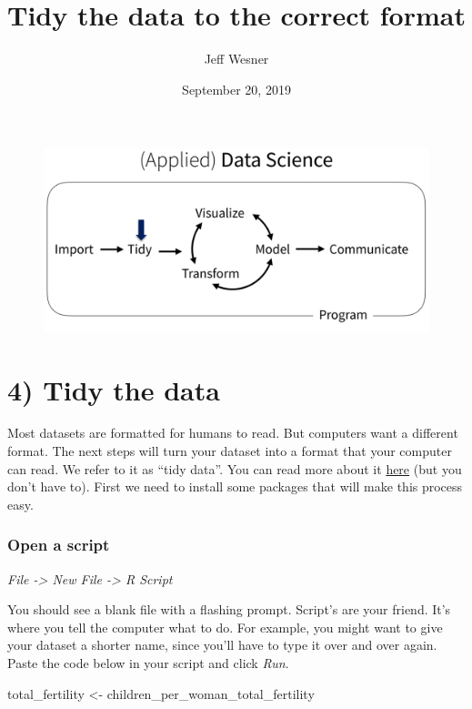 \documentclass[]{article}
\title{Tidy the data to the correct format}
\author{Jeff Wesner}
\date{September 20, 2019}
\newenvironment{Shaded}{\begin{snugshade}}{\end{snugshade}}
\newcommand{\StringTok}[1]{\textcolor[rgb]{0.31,0.60,0.02}{#1}}
\newcommand{\NormalTok}[1]{#1}
\begin{document}
\maketitle

\begin{figure}
\centering
\includegraphics{data_workflow_tidy.png}
\caption{}
\end{figure}

\section{4) Tidy the data}\label{tidy-the-data}

Most datasets are formatted for humans to read. But computers want a
different format. The next steps will turn your dataset into a format
that your computer can read. We refer to it as ``tidy data''. You can
read more about it
\href{http://www.cs.umd.edu/class/fall2018/cmsc641/files/tidy_data.pdf}{here}
(but you don't have to). First we need to install some packages that
will make this process easy.

\subsubsection{Open a script}\label{open-a-script}

\emph{File -\textgreater{} New File -\textgreater{} R Script}

You should see a blank file with a flashing prompt. Script's are your
friend. It's where you tell the computer what to do. For example, you
might want to give your dataset a shorter name, since you'll have to
type it over and over again. Paste the code below in your script and
click \emph{Run}.

\begin{Shaded}
\begin{Highlighting}[]
\NormalTok{total_fertility <-}\StringTok{ }\NormalTok{children_per_woman_total_fertility}
\end{Highlighting}
\end{Shaded}
\end{document}
